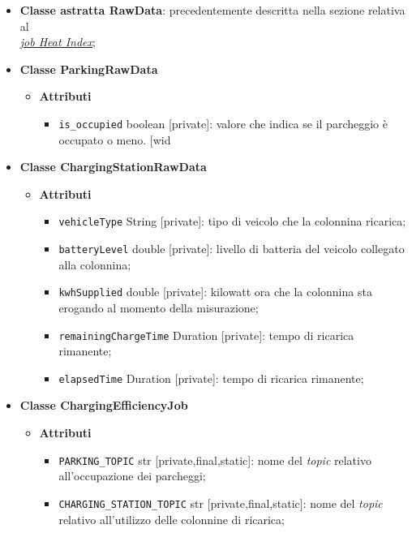 \begin{itemize}
	\item \textbf{Classe astratta RawData}: precedentemente descritta nella sezione relativa al \\\hyperref[abstract_class_raw_data]{\textit{\underline{job Heat Index}}};
	\item \textbf{Classe ParkingRawData}
	      \begin{itemize}
		      \item \textbf{Attributi}
		            \begin{itemize}
			            \item \texttt{is\_occupied} boolean [private]: valore che indica se il parcheggio è occupato o meno.
			                  [wid\end{itemize}
	      \end{itemize}
	\item \textbf{Classe ChargingStationRawData}
	      \begin{itemize}
		      \item \textbf{Attributi}
		            \begin{itemize}
			            \item \texttt{vehicleType} String [private]: tipo di veicolo che la colonnina ricarica;
			            \item \texttt{batteryLevel} double [private]: livello di batteria del veicolo collegato alla colonnina;
			            \item \texttt{kwhSupplied} double [private]: kilowatt ora che la colonnina sta erogando al momento della misurazione;
			            \item \texttt{remainingChargeTime} Duration [private]: tempo di ricarica rimanente;
			            \item \texttt{elapsedTime} Duration [private]: tempo di ricarica rimanente;
		            \end{itemize}
	      \end{itemize}
	\item \textbf{Classe ChargingEfficiencyJob}
	      \begin{itemize}
		      \item \textbf{Attributi}
		            \begin{itemize}
			            \item \texttt{PARKING\_TOPIC} str [private,final,static]: nome del \textit{topic} relativo all'occupazione dei parcheggi;
			            \item \texttt{CHARGING\_STATION\_TOPIC} str [private,final,static]: nome del \textit{topic} relativo all'utilizzo delle colonnine di ricarica;

\end{itemize}
\end{itemize}
\end{itemize}
